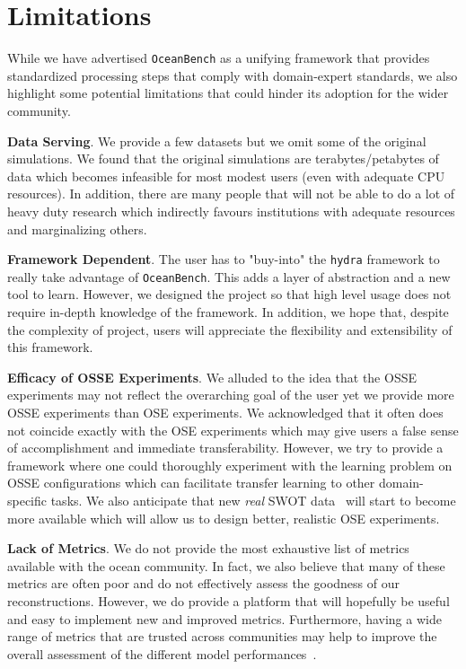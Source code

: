 \section{Limitations} \label{sec:appendix_limitations}

While we have advertised \texttt{OceanBench} as a unifying framework that provides standardized processing steps that comply with domain-expert standards, we also highlight some potential limitations that could hinder its adoption for the wider community.

\textbf{Data Serving}. We provide a few datasets but we omit some of the original simulations. We found that the original simulations are terabytes/petabytes of data which becomes infeasible for most modest users (even with adequate CPU resources). In addition, there are many people that will not be able to do a lot of heavy duty research which indirectly favours institutions with adequate resources and marginalizing others.

\textbf{Framework Dependent}. The user has to "buy-into" the \texttt{hydra} framework to really take advantage of \texttt{OceanBench}. This adds a layer of abstraction and a new tool to learn. 
However, we designed the project so that high level usage does not require in-depth knowledge of the framework. 
In addition, we hope that, despite the complexity of project, users will appreciate the flexibility and extensibility of this framework.

\textbf{Efficacy of OSSE Experiments}. We alluded to the idea that the OSSE experiments may not reflect the overarching goal of the user yet we provide more OSSE experiments than OSE experiments.
We acknowledged that it often does not coincide exactly with the OSE experiments which may give users a false sense of accomplishment and immediate transferability. 
However, we try to provide a framework where one could thoroughly experiment with the learning problem on OSSE configurations which can facilitate transfer learning to other domain-specific tasks.
We also anticipate that new \textit{real} SWOT data~\cite{SWOT} will start to become more available which will allow us to design better, realistic OSE experiments.

\textbf{Lack of Metrics}. We do not provide the most exhaustive list of metrics available with the ocean community. In fact, we also believe that many of these metrics are often poor and do not effectively assess the goodness of our reconstructions. 
However, we do provide a platform that will hopefully be useful and easy to implement new and improved metrics.
Furthermore, having a wide range of metrics that are trusted across communities may help to improve the overall assessment of the different model performances~\cite{METRICSAVERAGE}.

